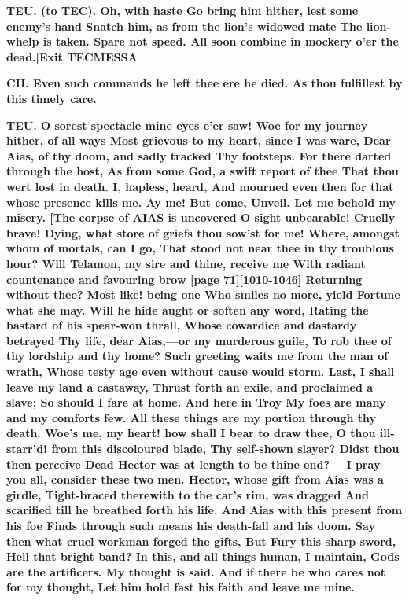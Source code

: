 \documentclass[11pt,letter]{book}
\begin{document}
\par \textbf{TEU. (to TEC). Oh, with haste Go bring him hither, lest some enemy’s hand Snatch him, as from the lion’s widowed mate The lion-whelp is taken. Spare not speed. All soon combine in mockery o’er the dead.[Exit TECMESSA}
\par 

\par \textbf{CH. Even such commands he left thee ere he died. As thou fulfillest by this timely care.}
\par 

\par \textbf{TEU. O sorest spectacle mine eyes e’er saw! Woe for my journey hither, of all ways Most grievous to my heart, since I was ware, Dear Aias, of thy doom, and sadly tracked Thy footsteps. For there darted through the host, As from some God, a swift report of thee That thou wert lost in death. I, hapless, heard, And mourned even then for that whose presence kills me. Ay me! But come, Unveil. Let me behold my misery. [The corpse of AIAS is uncovered O sight unbearable! Cruelly brave! Dying, what store of griefs thou sow’st for me! Where, amongst whom of mortals, can I go, That stood not near thee in thy troublous hour? Will Telamon, my sire and thine, receive me With radiant countenance and favouring brow [page 71][1010-1046] Returning without thee? Most like! being one Who smiles no more, yield Fortune what she may. Will he hide aught or soften any word, Rating the bastard of his spear-won thrall, Whose cowardice and dastardy betrayed Thy life, dear Aias,—or my murderous guile, To rob thee of thy lordship and thy home? Such greeting waits me from the man of wrath, Whose testy age even without cause would storm. Last, I shall leave my land a castaway, Thrust forth an exile, and proclaimed a slave; So should I fare at home. And here in Troy My foes are many and my comforts few. All these things are my portion through thy death. Woe’s me, my heart! how shall I bear to draw thee, O thou ill-starr’d! from this discoloured blade, Thy self-shown slayer? Didst thou then perceive Dead Hector was at length to be thine end?— I pray you all, consider these two men. Hector, whose gift from Aias was a girdle, Tight-braced therewith to the car’s rim, was dragged And scarified till he breathed forth his life. And Aias with this present from his foe Finds through such means his death-fall and his doom. Say then what cruel workman forged the gifts, But Fury this sharp sword, Hell that bright band? In this, and all things human, I maintain, Gods are the artificers. My thought is said. And if there be who cares not for my thought, Let him hold fast his faith and leave me mine.}
\par 
\end{document}
